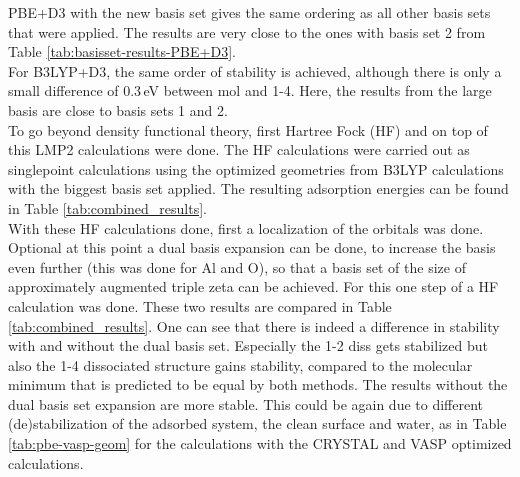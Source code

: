 \documentclass[11pt,DIV=13,BCOR=5mm,a4paper,headinclude]{scrbook}
\begin{document}
PBE+D3 with the new basis set gives the same ordering as all other basis sets that were applied.
The results are very close to the ones with basis set 2 from Table \ref{tab:basisset-results-PBE+D3}.
\\
For B3LYP+D3, the same order of stability is achieved, although there is only a small difference of $0.3\,$eV between mol and 1-4.
Here, the results from the large basis are close to basis sets 1 and 2.
\\
To go beyond density functional theory, first Hartree Fock (HF) and on top of this LMP2 calculations were done.
The HF calculations were carried out as singlepoint calculations using the optimized geometries from B3LYP calculations with the biggest basis set applied.
The resulting adsorption energies can be found in Table \ref{tab:combined_results}. %
\\
With these HF calculations done, first a localization of the orbitals was done.
Optional at this point a dual basis expansion can be done, to increase the basis even further (this was done for Al and O), so that a basis set of the size of approximately augmented triple zeta can be achieved.
For this one step of a HF calculation was done.
These two results are compared in Table \ref{tab:combined_results}. %
One can see that there is indeed a difference in stability with and without the dual basis set.
Especially the 1-2 diss gets stabilized but also the 1-4 dissociated structure gains stability, compared to the molecular minimum that is predicted to be equal by both methods.
The results without the dual basis set expansion are more stable.
This could be again due to different (de)stabilization of the adsorbed system, the clean surface and water, as in Table \ref{tab:pbe-vasp-geom} for the calculations with the CRYSTAL and VASP optimized calculations.
\end{document}
